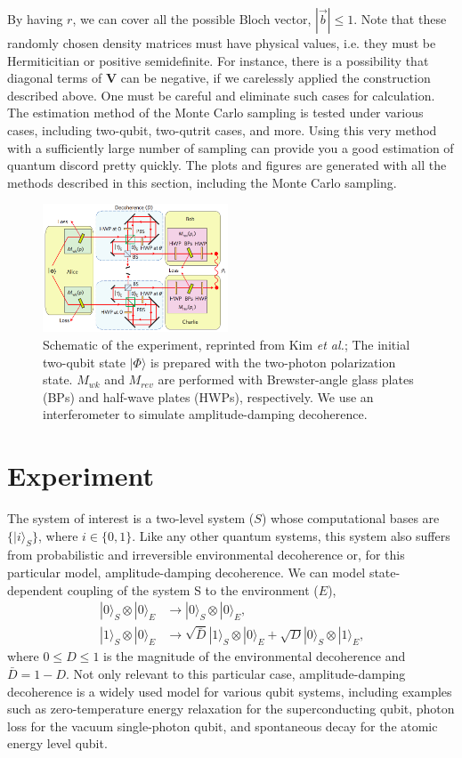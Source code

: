 \documentclass[%
 reprint,
 amsmath,amssymb,
 aps,
]{revtex4-1}
\begin{document}
\noindent By having $r$, we can cover all the possible Bloch vector, $|\vec{b}| \le 1$. Note that these randomly chosen density matrices must have physical values, i.e. they must be Hermiticitian or positive semidefinite. For instance, there is a possibility that diagonal terms of $\textbf{V}$ can be negative, if we carelessly applied the construction described above. One must be careful and eliminate such cases for calculation. The estimation method of the Monte Carlo sampling is tested under various cases, including two-qubit, two-qutrit cases, and more. Using this very method with a sufficiently large number of sampling can provide you a good estimation of quantum discord pretty quickly. The plots and figures are generated with all the methods described in this section, including the Monte Carlo sampling. 

\begin{figure}
        \centering
        \includegraphics[width=0.49\textwidth]{setup}
        \caption{Schematic of the experiment, reprinted from Kim \textit{et al.}; The initial two-qubit state $|\Phi\rangle$ is prepared with the two-photon polarization state. $M_{wk}$ and $M_{rev}$ are performed with Brewster-angle glass plates (BPs) and half-wave plates (HWPs), respectively. We use an interferometer to simulate amplitude-damping decoherence.}\label{fig:setup}
\end{figure}

\section{Experiment}
\noindent The system of interest is a two-level system ($S$) whose computational bases are $\{|i\rangle_S\}$, where $i \in \{0,1\}$. Like any other quantum systems, this system also suffers from probabilistic and irreversible environmental decoherence or, for this particular model, amplitude-damping decoherence. We can model state-dependent coupling of the system S to the environment ($E$),
\begin{align*}
|0\rangle_S \otimes |0\rangle_E  & \rightarrow  |0\rangle_S \otimes |0\rangle_E \text{,} \\
|1\rangle_S \otimes |0\rangle_E  & \rightarrow  \sqrt{\bar{D}} |1\rangle_S \otimes |0\rangle_E + \sqrt{D} |0\rangle_S \otimes |1\rangle_E \text{,}
\end{align*}
\noindent where $0 \le D \le 1$ is the magnitude of the environmental decoherence and $\bar{D}=1-D$. Not only relevant to this particular case, amplitude-damping decoherence is a widely used model for various qubit systems, including examples such as zero-temperature energy relaxation for the superconducting qubit, photon loss for the vacuum single-photon qubit, and spontaneous decay for the atomic energy level qubit.
\end{document}
